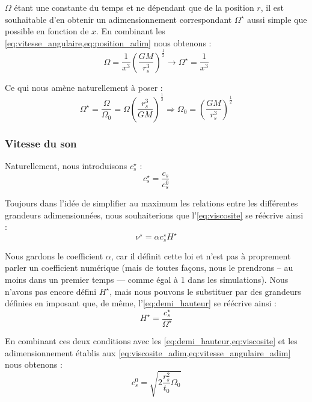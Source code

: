 $\Omega$ étant une constante du temps et ne dépendant que de la position $r$,
il est souhaitable d’en obtenir un adimensionnement correspondant
$\Omega^\star$ aussi simple que possible en fonction de $x$. En combinant les
\cref{eq:vitesse_angulaire,eq:position_adim} nous obtenons :
\begin{equation}
    \Omega = \frac{1}{x^3} \left( \frac{G M}{r_s^3} \right)^\frac{1}{2} \rightarrow \Omega^\star = \frac{1}{x^3}
\end{equation}

Ce qui nous amène naturellement à poser :
\begin{equation}
    \label{eq:vitesse_angulaire_adim}
    \Omega^\star = \frac{\Omega}{\Omega_0} = \Omega \left( \frac{r_s^3}{G M} \right)^\frac{1}{2} \Rightarrow \Omega_0 = \left( \frac{G M}{r_s^3} \right)^\frac{1}{2}
\end{equation}

\subsubsection{Vitesse du son}

Naturellement, nous introduisons $c_s^\star$ :
\begin{equation}
   c_s^\star = \frac{c_s}{c_s^0}
\end{equation}

Toujours dans l’idée de simplifier au maximum les relations entre les
différentes grandeurs adimensionnées, nous souhaiterions que
l’\cref{eq:viscosite} se réécrive ainsi :
\begin{equation}
    \nu^\star = \alpha c_s^\star H^\star
\end{equation}

Nous gardons le coefficient $\alpha$, car il définit cette loi et n’est pas à
proprement parler un coefficient numérique (mais de toutes façons, nous le
prendrons – au moins dans un premier temps — comme égal à 1 dans les
simulations). Nous n’avons pas encore défini $H^\star$, mais nous pouvons le
substituer par des grandeurs définies en imposant que, de même,
l’\cref{eq:demi_hauteur} se réécrive ainsi :
\begin{equation}
    \label{eq:rel_demi_hauteur_adim}
    H^\star = \frac{c_s^\star}{\Omega^\star}
\end{equation}

En combinant ces deux conditions avec les \cref{eq:demi_hauteur,eq:viscosite} et les adimensionnement
établis aux \cref{eq:viscosite_adim,eq:vitesse_angulaire_adim} nous obtenons :
\begin{equation}
    c_s^0 = \sqrt{2 \frac{r_s^2}{t_0} \Omega_0}
\end{equation}

